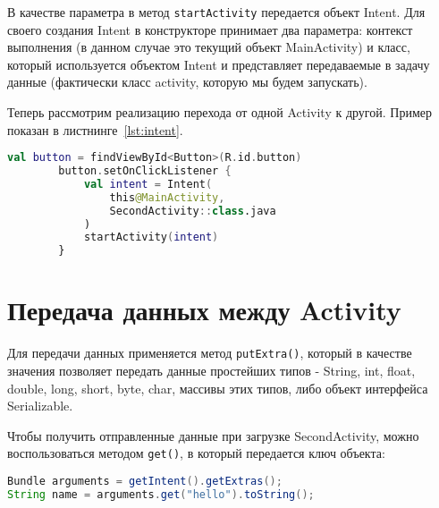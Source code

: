В качестве параметра в метод \texttt{startActivity} передается объект Intent.
Для своего создания Intent в конструкторе принимает два параметра: контекст
выполнения (в данном случае это текущий объект MainActivity) и класс,
который используется объектом Intent и представляет передаваемые в задачу
данные (фактически класс activity, которую мы будем запускать).\par
Теперь рассмотрим реализацию перехода от одной Activity к другой.
Пример показан в листнинге~\ref{lst:intent}.
\begin{lstlisting}[language=Kotlin, caption=\leftline{}, label=lst:intent]
val button = findViewById<Button>(R.id.button)
        button.setOnClickListener {
            val intent = Intent(
                this@MainActivity,
                SecondActivity::class.java
            )
            startActivity(intent)
        }
\end{lstlisting}

\section{Передача данных между Activity}
Для передачи данных применяется метод \texttt{putExtra()}, который в качестве
значения позволяет передать данные простейших типов - String, int, float,
double, long, short, byte, char, массивы этих типов, либо объект интерфейса
Serializable.\par
Чтобы получить отправленные данные при загрузке SecondActivity, можно
воспользоваться методом \texttt{get()}, в который передается ключ объекта:

\begin{lstlisting}[language=Java
	, caption=\leftline{Получение намеренья}
	]
Bundle arguments = getIntent().getExtras();
String name = arguments.get("hello").toString();
\end{lstlisting}

